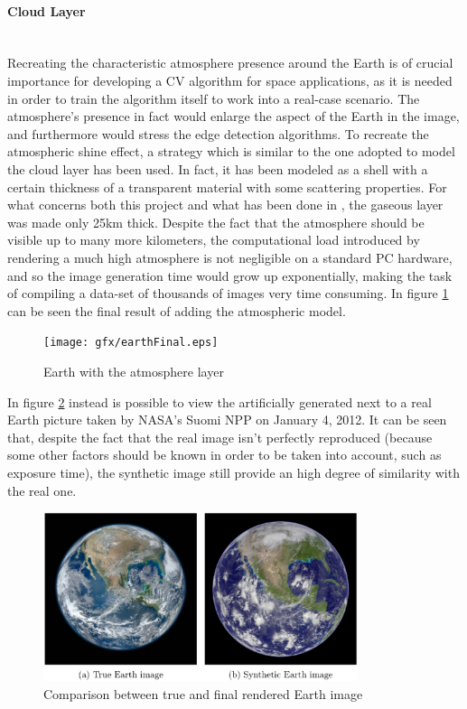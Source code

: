 \paragraph{Cloud Layer}\mbox{}\\
Recreating the characteristic atmosphere presence around the Earth is of crucial importance for developing a CV algorithm for space applications, as it is needed in order to train the algorithm itself to work into a real-case scenario.
The atmosphere's presence in fact would enlarge the aspect of the Earth in the image, and furthermore would stress the edge detection algorithms.
To recreate the atmospheric shine effect, a strategy which is similar to the one adopted to model the cloud layer has been used. In fact, it has been modeled as a shell with a certain thickness of a transparent material with some scattering properties.
For what concerns both this project and what has been done in \cite{jacopo}, the gaseous layer was made only \si{25}{km} thick. Despite the fact that the atmosphere should be visible up to many more kilometers, the computational load introduced by rendering a much high atmosphere is not negligible on a standard PC hardware, and so the image generation time would grow up exponentially, making the task of compiling a data-set of thousands of images very time consuming.
In figure \ref{fig:earthAtmo} can be seen the final result of adding the atmospheric model.

\begin{figure}
  \centering
  \texttt{[image: gfx/earthFinal.eps]}
  \caption{Earth with the atmosphere layer}
  \label{fig:earthAtmo}
\end{figure}

In figure \ref{fig:trueVsFake} instead is possible to view the artificially generated next to a real Earth picture taken by NASA's Suomi NPP on January 4, 2012.
It can be seen that, despite the fact that the real image isn't perfectly reproduced (because some other factors should be known in order to be taken into account, such as exposure time), the synthetic image still provide an high degree of similarity with the real one.

\begin{figure}
  \centering
  \includegraphics[width=0.82\textwidth]{gfx/trueVsFake.eps}
  \caption{Comparison between true and final rendered Earth image}
  \label{fig:trueVsFake}
\end{figure}


